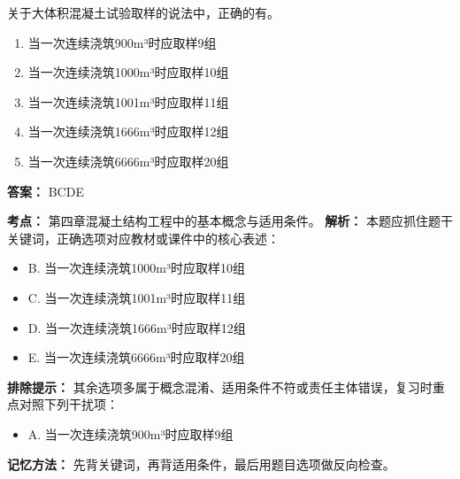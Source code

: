 \documentclass[UTF8,fontset=fandol,11pt]{ctexart}
\begin{document}
\begin{quizbox}[title={第 88 题}]
关于大体积混凝土试验取样的说法中，正确的有。\\
\begin{enumerate}[label=\Alph*.]
\item 当一次连续浇筑900m³时应取样9组
\item 当一次连续浇筑1000m³时应取样10组
\item 当一次连续浇筑1001m³时应取样11组
\item 当一次连续浇筑1666m³时应取样12组
\item 当一次连续浇筑6666m³时应取样20组
\end{enumerate}
\textbf{答案：} BCDE
\vspace{0.25em}
\begin{answerbox}[title={考点解析}]
\textbf{考点：} 第四章混凝土结构工程中的基本概念与适用条件。
\textbf{解析：} 本题应抓住题干关键词，正确选项对应教材或课件中的核心表述：
\begin{itemize}
\item B. 当一次连续浇筑1000m³时应取样10组
\item C. 当一次连续浇筑1001m³时应取样11组
\item D. 当一次连续浇筑1666m³时应取样12组
\item E. 当一次连续浇筑6666m³时应取样20组
\end{itemize}
\textbf{排除提示：} 其余选项多属于概念混淆、适用条件不符或责任主体错误，复习时重点对照下列干扰项：
\begin{itemize}
\item A. 当一次连续浇筑900m³时应取样9组
\end{itemize}
\textbf{记忆方法：} 先背关键词，再背适用条件，最后用题目选项做反向检查。
\end{answerbox}
\end{quizbox}
\end{document}
